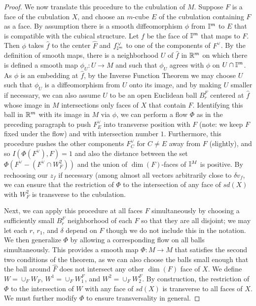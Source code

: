 \begin{proof}
We now translate this procedure to the cubulation of $M$.
Suppose $F$ is a face of the cubulation $X$, and choose an $m$-cube $E$ of the cubulation containing $F$ as a face. By assumption there is a smooth diffeomorphism $\phi$ from $\mathbb{I}^m$ to $E$ that is compatible with the cubical structure. Let $f$ be the face of $\mathbb{I}^m$ that maps to $F$. Then $\phi$ takes $\hat f$ to the center $\hat F$ and $f^\vee_{\mathbb{I}^m}$ to one of the components of $F^\vee$. By the definition of smooth maps, there is a neighborhood $U$ of $\hat f$ in $\mathbb{R}^m$ on which there is defined a smooth map $\phi_U:U \to M$ and such that $\phi_U$ agrees with $\phi$ on $U \cap \mathbb{I}^m$. As $\phi$ is an embedding at $\hat f$, by the Inverse Function Theorem we may choose $U$ such that $\phi_U$ is a diffeomorphism from $U$ onto its image, and by making $U$ smaller if necessary, we can also assume $U$ to be an open Euclidean ball $B^F_r$ centered at $\hat f$ whose image in $M$ intersections only faces of $X$ that contain $F$. Identifying this ball in $\mathbb{R}^m$ with its image in $M$ via $\phi$, we can perform a flow $\Phi$ as in the preceding paragraph to push $F^\vee_E$ into transverse position with $F$ (note: we keep $F$ fixed under the flow) and with intersection number $1$. Furthermore, this procedure pushes the other components $F^\vee_C$ for $C\neq E$ away from $F$ (slightly), and so $I(\Phi(F^\vee),F) = 1$ and also the distance between the set $\Phi(F^\vee-(F^\vee \cap W^2_F))$ and the union of $\dim(F)$-faces of $\mathbb{I}^M$ is positive. By rechoosing our $z_f$ if necessary (among almost all vectors arbitrarily close to $\delta v_f$, we can ensure that the restriction of $\Phi$ to the intersection of any face of $sd(X)$ with $W^2_F$ is transverse to the cubulation.

Next, we can apply this procedure at all faces $F$ simultaneously by choosing a sufficiently small $B^F_r$ neighborhood of each $\hat F$ so that they are all disjoint; we may let each $r$, $r_1$, and $\delta$ depend on $F$ though we do not include this in the notation. We then generalize $\Phi$ by allowing a corresponding flow on all balls simultaneously. This provides a smooth map $\Phi \colon M \to M$ that satisfies the second two conditions of the theorem, as we can also choose the balls small enough that the ball around $\hat F$ does not intersect any other $\dim(F)$ face of $X$. We define $W = \cup_F W_F$, $W^1 = \cup_F W^F_1$, and $W^2 = \cup_F W^F_2$. By construction, the restriction of $\Phi$ to the intersection of $W$ with any face of $sd(X)$ is transverse to all faces of $X$.
We must further modify $\Phi$ to ensure transversality in general.


\end{proof}
